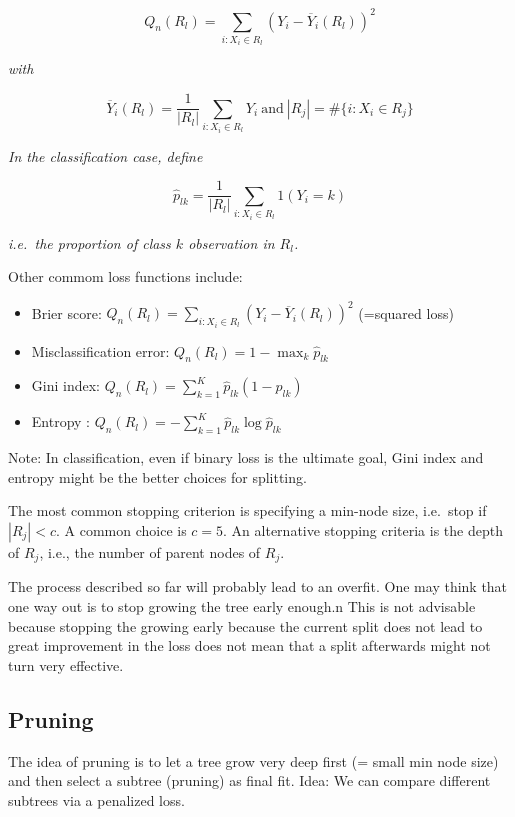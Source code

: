 \documentclass[a4paper,10pt,openany]{book}
\providecommand{\tightlist}{%
 \setlength{\itemsep}{0pt}\setlength{\parskip}{0pt}}
\begin{document}
\[
Q_n(R_l)= \sum_{i: X_i \in R_l} (Y_i - \overline Y_i(R_l))^2
\]

\emph{with}

\[
\overline Y_i(R_l)= \frac 1 {|R_l|}\sum_{i: X_i \in R_l}Y_i\ \text{and}\ |R_j|=\#\{i: X_i\in R_j\}
\]

\emph{In the classification case, define}

\[
\hat p_{lk}= \frac 1 {|R_l|} \sum_{i: X_i \in R_l}   1(Y_i=k)
\]

\emph{i.e.~the proportion of class \(k\) observation in \(R_l\).}

Other commom loss functions include:

\begin{itemize}
\tightlist
\item
  Brier score: \(Q_n(R_l)= \sum_{i: X_i \in R_l} (Y_i - \overline Y_i(R_l))^2\) (=squared loss)
\item
  Misclassification error: \(Q_n(R_l)= 1 - \max_{k}\hat p_{lk}\)
\item
  Gini index: \(Q_n(R_l)= \sum_{k=1}^K \hat p_{lk}(1-\hat p_{lk})\)
\item
  Entropy : \(Q_n(R_l)=-\sum_{k=1}^K \hat p_{lk}\log\hat p_{lk}\)
\end{itemize}

Note: In classification, even if binary loss is the ultimate goal, Gini index and entropy might be the better choices for splitting.

The most common stopping criterion is specifying a min-node size, i.e.~stop if \(|R_j|<c\). A common choice is \(c=5\). An alternative stopping criteria is the depth of \(R_j\), i.e., the number of parent nodes of \(R_j\).

The process described so far will probably lead to an overfit. One may think that one way out is to stop growing the tree early enough.n This is not advisable because stopping the growing early because the current split does not lead to great improvement in the loss does not mean that a split afterwards might not turn very effective.

\hypertarget{pruning}{%
\subsection{Pruning}\label{pruning}}

The idea of pruning is to let a tree grow very deep first (= small min node size) and then select a subtree (pruning) as final fit. Idea: We can compare different subtrees via a penalized loss.
\end{document}
